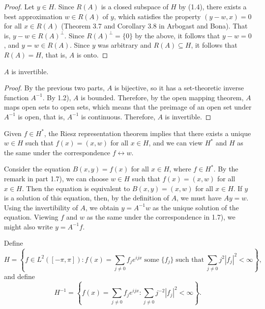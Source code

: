 \documentclass{homework}
\begin{document}
\begin{arabicparts}
\begin{proof}
			Let $y \in H$. Since $R(A)$ is a closed subspace of $H$ by (1.4), there exists a best approximation $w \in R(A)$ of $y$, which satisfies the property $(y - w, x) = 0$ for all $x \in R(A)$ (Theorem 3.7 and Corollary 3.8 in Arbogast and Bona). That is, $y-w \in R(A)^\perp$. Since $R(A)^\perp =\{0\}$ by the above, it follows that $y-w = 0$, and $y=w \in R(A)$. Since $y$ was arbitrary and $R(A) \subseteq H$, it follows that $R(A) = H$, that is, $A$  is onto.
		\end{proof}
		
		\questionpart
		$A$ is invertible.
		\begin{proof}
			By the previous two parts, $A$ is bijective, so it has a set-theoretic inverse function $A^{-1}$. By 1.2), $A$ is bounded. Therefore, by the open mapping theorem, $A$ maps open sets to open sets, which means that the preimage of an open set under $A^{-1}$ is open, that is, $A^{-1}$ is continuous. Therefore, $A$ is invertible.
		\end{proof}
		
		\questionpart
		Given $f \in H^{*}$, the Riesz representation theorem implies that there exists a unique $w \in H$ such that $f(x) = (x,w)$ for all $x \in H$, and we can view $H^{*}$ and $H$ as the same under the correspondence $f \leftrightarrow w$.
		
		\questionpart
		Consider the equation $B(x,y) = f(x)$ for all $x \in H$, where $f \in H^{*}$. By the remark in part 1.7), we can choose $w \in H$ such that $f(x) = (x,w)$ for all $x \in H$. Then the equation is equivalent to $B(x,y) = (x,w)$ for all $x \in H$. If $y$ is a solution of this equation, then, by the definition of $A$, we must have $Ay = w$. Using the invertibility of $A$, we obtain $y = A^{-1}w$ as the unique solution of the equation. Viewing $f$ and $w$ as the same under the correspondence in 1.7), we might also write $y = A^{-1}f$.
	\end{arabicparts}
	
	\question
	\newcommand{\ltwo}{L^2([-\pi, \pi])}
	\newcommand{\hm}{{H^{-1}}}
	Define
	\begin{equation}
		H = \left\{f \in \ltwo : f(x) = \sum_{j\ne 0}f_je^{ijx}\;\text{some}\;\{f_j\}\;\text{such that}\;\sum_{j\ne 0}j^2|f_j|^2 < \infty\right\},
	\end{equation}
	and define
	\begin{equation}
		\hm = \left\{f(x) = \sum_{j\ne0}f_je^{ijx} : \sum_{j\ne 0}j^{-2}|f_j|^2 < \infty\right\}.
	\end{equation}
	
\end{document}
